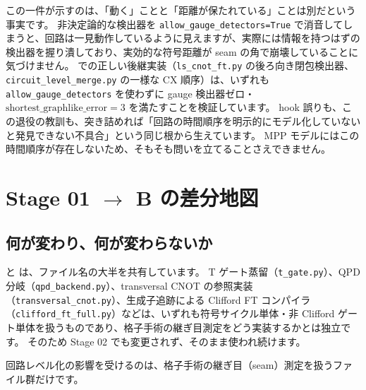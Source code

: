 この一件が示すのは、「動く」ことと「距離が保たれている」ことは別だという事実です。
非決定論的な検出器を \texttt{allow\_gauge\_detectors=True} で消音してしまうと、回路は一見動作しているように見えますが、実際には情報を持つはずの検出器を握り潰しており、実効的な符号距離が seam の角で崩壊していることに気づけません。
 での正しい後継実装（\texttt{ls\_cnot\_ft.py} の後ろ向き閉包検出器、\texttt{circuit\_level\_merge.py} の一様な CX 順序）は、いずれも \texttt{allow\_gauge\_detectors} を使わずに gauge 検出器ゼロ・$\mathrm{shortest\_graphlike\_error}=3$ を満たすことを検証しています。
hook 誤りも、この退役の教訓も、突き詰めれば「回路の時間順序を明示的にモデル化していないと発見できない不具合」という同じ根から生えています。
MPP モデルにはこの時間順序が存在しないため、そもそも問いを立てることさえできません。

\section{Stage 01 \texorpdfstring{$\to$}{→} B の差分地図}\label{sec:diff_map}

\subsection{何が変わり、何が変わらないか}

 と  は、ファイル名の大半を共有しています。
T ゲート蒸留（\texttt{t\_gate.py}）、QPD 分岐（\texttt{qpd\_backend.py}）、transversal CNOT の参照実装（\texttt{transversal\_cnot.py}）、生成子追跡による Clifford FT コンパイラ（\texttt{clifford\_ft\_full.py}）などは、いずれも符号サイクル単体・非 Clifford ゲート単体を扱うものであり、格子手術の継ぎ目測定をどう実装するかとは独立です。
そのため Stage 02 でも変更されず、そのまま使われ続けます。

回路レベル化の影響を受けるのは、格子手術の継ぎ目（seam）測定を扱うファイル群だけです。

